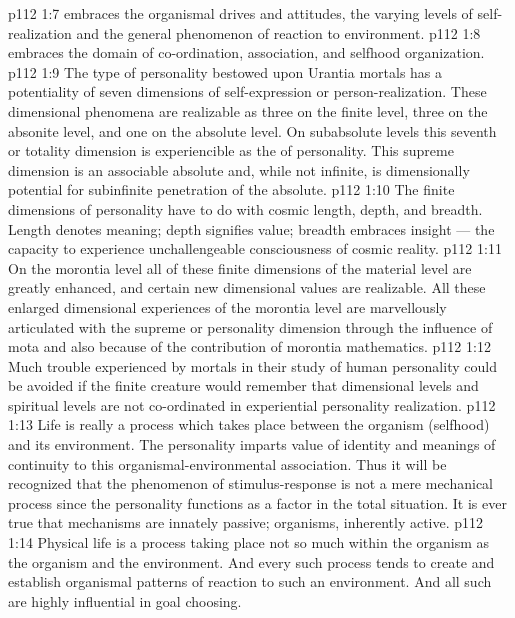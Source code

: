 \vs p112 1:7 \bibnobreakspace {} embraces the organismal drives and attitudes, the varying levels of self\hyp{}realization and the general phenomenon of reaction to environment.
\vs p112 1:8 \bibnobreakspace {} embraces the domain of co\hyp{}ordination, association, and selfhood organization.
\vs p112 1:9 \pc The type of personality bestowed upon Urantia mortals has a potentiality of seven dimensions of self\hyp{}expression or person\hyp{}realization. These dimensional phenomena are realizable as three on the finite level, three on the absonite level, and one on the absolute level. On subabsolute levels this seventh or totality dimension is experiencible as the  of personality. This supreme dimension is an associable absolute and, while not infinite, is dimensionally potential for subinfinite penetration of the absolute.
\vs p112 1:10 The finite dimensions of personality have to do with cosmic length, depth, and breadth. Length denotes meaning; depth signifies value; breadth embraces insight --- the capacity to experience unchallengeable consciousness of cosmic reality.
\vs p112 1:11 On the morontia level all of these finite dimensions of the material level are greatly enhanced, and certain new dimensional values are realizable. All these enlarged dimensional experiences of the morontia level are marvellously articulated with the supreme or personality dimension through the influence of mota and also because of the contribution of morontia mathematics.
\vs p112 1:12 Much trouble experienced by mortals in their study of human personality could be avoided if the finite creature would remember that dimensional levels and spiritual levels are not co\hyp{}ordinated in experiential personality realization.
\vs p112 1:13 \pc Life is really a process which takes place between the organism (selfhood) and its environment. The personality imparts value of identity and meanings of continuity to this organismal\hyp{}environmental association. Thus it will be recognized that the phenomenon of stimulus\hyp{}response is not a mere mechanical process since the personality functions as a factor in the total situation. It is ever true that mechanisms are innately passive; organisms, inherently active.
\vs p112 1:14 Physical life is a process taking place not so much within the organism as  the organism and the environment. And every such process tends to create and establish organismal patterns of reaction to such an environment. And all such  are highly influential in goal choosing.
